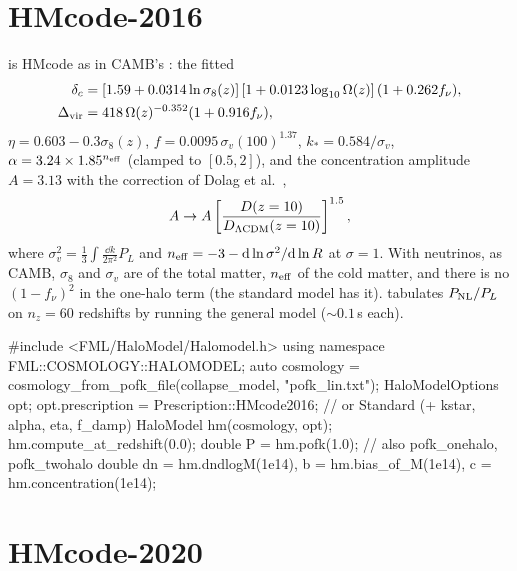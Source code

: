 \section{HMcode-2016}\label{sec:hm-hmcode2016}

 is HMcode as in CAMB's  \cite{Mead2015,Mead2016}: the fitted
\begin{align}
\delta_c&=\left[1.59+0.0314\ln\sigma_8(z)\right]\left[1+0.0123\log_{10}\Omega(z)\right](1+0.262f_\nu),\\
\Delta_{\rm vir}&=418\,\Omega(z)^{-0.352}(1+0.916f_\nu),
\end{align}
$\eta=0.603-0.3\sigma_8(z)$, $f=0.0095\,\sigma_v(100)^{1.37}$, $k_*=0.584/\sigma_v$, $\alpha=3.24\times1.85^{n_{\rm eff}}$
(clamped to $[0.5,2]$), and the concentration amplitude $A=3.13$ with the correction of Dolag et al.\ \cite{Dolag2004},
\begin{equation}
A\to A\left[\frac{D(z=10)}{D_{\Lambda\rm CDM}(z=10)}\right]^{1.5},
\end{equation}
where $\sigma_v^2=\frac13\int\frac{\dd k}{2\pi^2}P_L$ and
$n_{\rm eff}=-3-\mathrm{d}\ln\sigma^2/\mathrm{d}\ln R$ at $\sigma=1$. With neutrinos, as CAMB, $\sigma_8$ and $\sigma_v$ are of the total
matter, $n_{\rm eff}$ of the cold matter, and there is no $(1-f_\nu)^2$ in the one-halo term (the standard model has it).
 tabulates $P_{\rm NL}/P_L$ on $n_z=60$ redshifts by running the general model ($\sim0.1$\,s each).

\begin{cppcode}
#include <FML/HaloModel/Halomodel.h>
using namespace FML::COSMOLOGY::HALOMODEL;
auto cosmology = cosmology_from_pofk_file(collapse_model, "pofk_lin.txt");
HaloModelOptions opt;
opt.prescription = Prescription::HMcode2016;     // or Standard (+ kstar, alpha, eta, f_damp)
HaloModel hm(cosmology, opt);
hm.compute_at_redshift(0.0);
double P   = hm.pofk(1.0);                       // also pofk_onehalo, pofk_twohalo
double dn  = hm.dndlogM(1e14), b = hm.bias_of_M(1e14), c = hm.concentration(1e14);
\end{cppcode}

\section{HMcode-2020}\label{sec:hm-hmcode2020}

